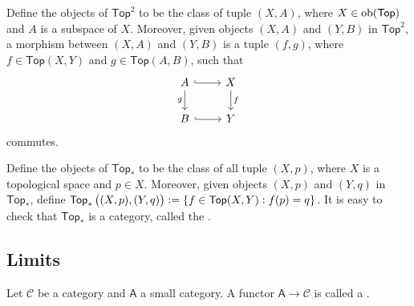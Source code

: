 \begin{example}
	Define the objects of $\mathsf{Top}^2$ to be the class of tuple $(X,A)$, where $X \in \operatorname{ob}(\mathsf{Top})$ and $A$ is a subspace of $X$. Moreover, given objects $(X,A)$ and $(Y,B)$ in $\mathsf{Top}^2$, a morphism between $(X,A)$ and $(Y,B)$ is a tuple $(f,g)$, where $f \in \mathsf{Top}(X,Y)$ and $g \in \mathsf{Top}(A,B)$, such that 
	\begin{equation*}
		\begin{tikzcd}
			A \arrow[r,hook]\arrow[d,"g"'] & X \arrow[d,"f"]\\
			B \arrow[r,hook] & Y
		\end{tikzcd}
	\end{equation*}
	\noindent commutes.
\end{example}

\begin{example}
	Define the objects of $\mathsf{Top}_\ast$ to be the class of all tuple $(X,p)$, where $X$ is a topological space and $p \in X$. Moreover, given objects $(X,p)$ and $(Y,q)$ in $\mathsf{Top}_\ast$, define $\mathsf{Top}_\ast\del[1]{(X,p),(Y,q)} := \cbr[0]{f \in \mathsf{Top}(X,Y) : f(p) = q}$. It is easy to check that $\mathsf{Top}_\ast$ is a category, called the .

\end{example}

\subsection*{Limits}

\begin{definition}[Diagram]
	Let $\mathcal{C}$ be a category and $\mathsf{A}$ a small category. A functor $\mathsf{A} \to \mathcal{C}$ is called a .
\end{definition}

